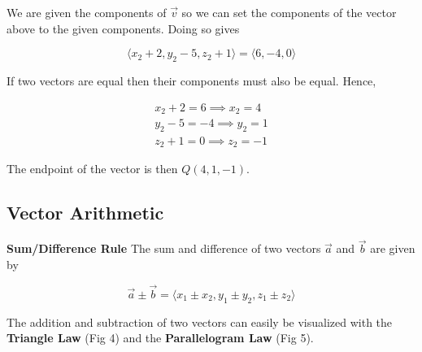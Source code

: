 \documentclass{article}
\begin{document}
            \noindent We are given the components of $\overrightarrow{v}$ so we can set the components
            of the vector above to the given components. Doing so gives

            \begin{equation*}
                \langle x_2+2,y_2-5,z_2+1\rangle=\langle6,-4,0\rangle
            \end{equation*}

            \noindent If two vectors are equal then their components must also be equal. Hence,

            \begin{center}
                \begin{align*}
                    x_2+2=6\implies x_2=4\\
                    y_2-5=-4\implies y_2=1\\
                    z_2+1=0\implies z_2=-1
                \end{align*}
            \end{center}

            \noindent The endpoint of the vector is then $Q(4,1,-1)$.


        \subsection{Vector Arithmetic}
            \textbf{Sum/Difference Rule} The sum and difference of two vectors $\overrightarrow{a}$
            and $\overrightarrow{b}$ are given by

            \begin{equation}
                \overrightarrow{a}\pm\overrightarrow{b}=\langle x_1\pm x_2, y_1 \pm y_2, z_1 \pm z_2\rangle
            \end{equation}

            \noindent The addition and subtraction of two vectors can easily be visualized with the
            \textbf{Triangle Law} (Fig 4) and the \textbf{Parallelogram Law} (Fig 5).
\end{document}
